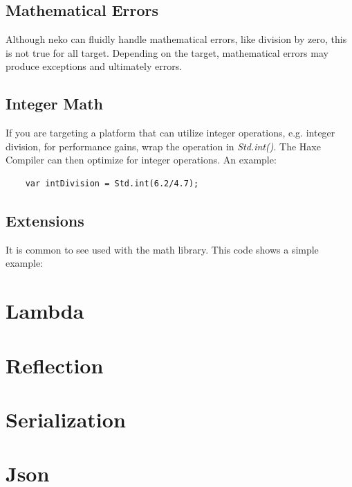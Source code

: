 \documentclass{haxe}
\begin{document}
\subsection{Mathematical Errors}
\label{std-math-mathematical-errors}
Although neko can fluidly handle mathematical errors, like division by zero, this is not true for all target.  Depending on the target, mathematical errors may produce exceptions and ultimately errors.

\subsection{Integer Math}
\label{std-math-integer-math}
If you are targeting a platform that can utilize integer operations, e.g. integer division, for performance gains, wrap the operation in \emph{Std.int()}.  The Haxe Compiler can then optimize for integer operations.  An example:
\begin{lstlisting}
	var intDivision = Std.int(6.2/4.7);
\end{lstlisting}

\subsection{Extensions}
\label{std-math-extensions}
It is common to see  used with the math library.  This code shows a simple example:  


\section{Lambda}
\label{std-Lambda}

\section{Reflection}
\label{std-reflection}

\section{Serialization}
\label{std-serialization}

\section{Json}
\label{std-Json}
\end{document}
